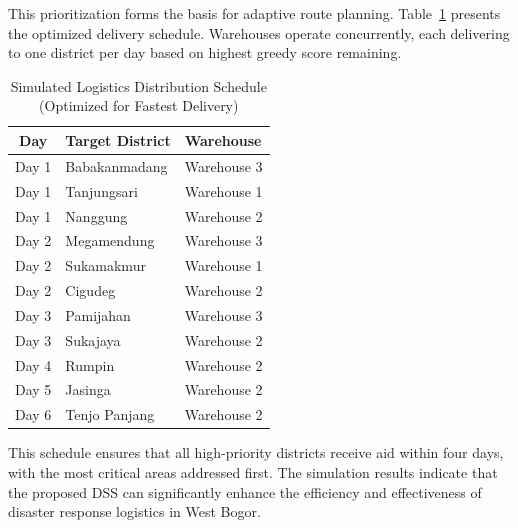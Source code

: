 \documentclass[journal,final,a4paper,twoside,11pt]{IEEEtran}
\begin{document}
This prioritization forms the basis for adaptive route planning. Table~\ref{tab:distribution_schedule} presents the optimized delivery schedule. Warehouses operate concurrently, each delivering to one district per day based on highest greedy score remaining.

\begin{table}[H]
\caption{Simulated Logistics Distribution Schedule (Optimized for Fastest Delivery)}
\begin{center}
\begin{tabular}{|c|l|l|}
\hline
\textbf{Day} & \textbf{Target District} & \textbf{Warehouse} \\
\hline
Day 1 & Babakanmadang & Warehouse 3 \\
\hline  Day 1 & Tanjungsari & Warehouse 1 \\
\hline  Day 1 & Nanggung & Warehouse 2 \\
\hline
Day 2 & Megamendung & Warehouse 3 \\
\hline  Day 2 & Sukamakmur & Warehouse 1 \\
\hline  Day 2 & Cigudeg & Warehouse 2 \\
\hline
Day 3 & Pamijahan & Warehouse 3 \\
\hline  Day 3 & Sukajaya & Warehouse 2 \\
\hline
Day 4 & Rumpin & Warehouse 2 \\
\hline
Day 5 & Jasinga & Warehouse 2 \\
\hline
Day 6 & Tenjo Panjang & Warehouse 2 \\
\hline
\end{tabular}
\label{tab:distribution_schedule}
\end{center}
\end{table}


This schedule ensures that all high-priority districts receive aid within four days, with the most critical areas addressed first. The simulation results indicate that the proposed DSS can significantly enhance the efficiency and effectiveness of disaster response logistics in West Bogor. 
\end{document}
